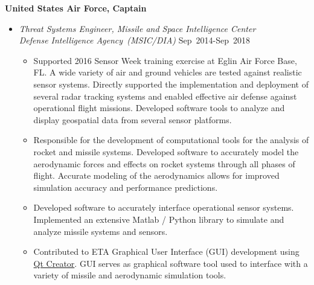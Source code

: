 \textbf{United States Air Force, Captain}
\begin{itemize}

\item[] \textit{Threat Systems Engineer, Missile and Space Intelligence Center \\
                Defense Intelligence Agency~(MSIC/DIA)}
                \hfill {Sep~2014-Sep~2018}
\begin{itemize}
    \item Supported 2016 Sensor Week training exercise at Eglin Air Force Base, FL.
    A wide variety of air and ground vehicles are tested against realistic sensor systems. 
    Directly supported the implementation and deployment of several radar tracking systems and enabled effective air defense against operational flight missions.
    Developed software tools to analyze and display geospatial data from several sensor platforms.
    \item Responsible for the development of computational tools for the analysis of rocket and missile systems.
    Developed software to accurately model the aerodynamic forces and effects on rocket systems through all phases of flight.
    Accurate modeling of the aerodynamics allows for improved simulation accuracy and performance predictions.
    \item Developed software to accurately interface operational sensor systems.
    Implemented an extensive Matlab / Python library to simulate and analyze missile systems and sensors. 
    \item Contributed to ETA Graphical User Interface (GUI) development using \href{https://www.qt.io/ide/}{Qt Creator}.
    GUI serves as graphical software tool used to interface with a variety of missile and aerodynamic simulation tools.
\end{itemize}
        

\end{itemize}
